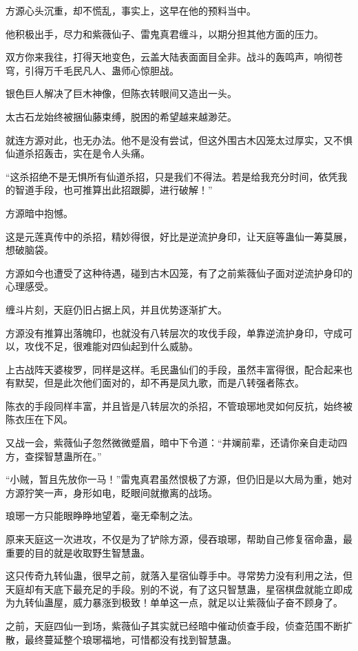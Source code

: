 \begin{this_body}
方源心头沉重，却不慌乱，事实上，这早在他的预料当中。

他积极出手，尽力和紫薇仙子、雷鬼真君缠斗，以期分担其他方面的压力。

双方你来我往，打得天地变色，云盖大陆表面面目全非。战斗的轰鸣声，响彻苍穹，引得万千毛民凡人、蛊师心惊胆战。

银色巨人解决了巨木神像，但陈衣转眼间又造出一头。

太古石龙始终被捆仙藤束缚，脱困的希望越来越渺茫。

就连方源对此，也无办法。他不是没有尝试，但这外围古木囚笼太过厚实，又不惧仙道杀招轰击，实在是令人头痛。

“这杀招绝不是无惧所有仙道杀招，只是我们不得法。若是给我充分时间，依凭我的智道手段，也可推算出此招跟脚，进行破解！”

方源暗中抱憾。

这是元莲真传中的杀招，精妙得很，好比是逆流护身印，让天庭等蛊仙一筹莫展，想破脑袋。

方源如今也遭受了这种待遇，碰到古木囚笼，有了之前紫薇仙子面对逆流护身印的心理感受。

缠斗片刻，天庭仍旧占据上风，并且优势逐渐扩大。

方源没有推算出落魄印，也就没有八转层次的攻伐手段，单靠逆流护身印，守成可以，攻伐不足，很难能对四仙起到什么威胁。

上古战阵天婆梭罗，同样是这样。毛民蛊仙们的手段，虽然丰富得很，配合起来也有默契，但是此次他们面对的，却不再是凤九歌，而是八转强者陈衣。

陈衣的手段同样丰富，并且皆是八转层次的杀招，不管琅琊地灵如何反抗，始终被陈衣压在下风。

又战一会，紫薇仙子忽然微微蹙眉，暗中下令道：“井斓前辈，还请你亲自走动四方，查探智慧蛊所在。”

“小贼，暂且先放你一马！”雷鬼真君虽然恨极了方源，但仍旧是以大局为重，她对方源狞笑一声，身形如电，眨眼间就撤离的战场。

琅琊一方只能眼睁睁地望着，毫无牵制之法。

原来天庭这一次进攻，不仅是为了铲除方源，侵吞琅琊，帮助自己修复宿命蛊，最重要的目的就是收取野生智慧蛊。

这只传奇九转仙蛊，很早之前，就落入星宿仙尊手中。寻常势力没有利用之法，但天庭却有天底下最充足的手段。别的不说，有了这只智慧蛊，星宿棋盘就能立即成为九转仙蛊屋，威力暴涨到极致！单单这一点，就足以让紫薇仙子奋不顾身了。

之前，天庭四仙一到场，紫薇仙子其实就已经暗中催动侦查手段，侦查范围不断扩散，最终蔓延整个琅琊福地，可惜都没有找到智慧蛊。


\end{this_body}
